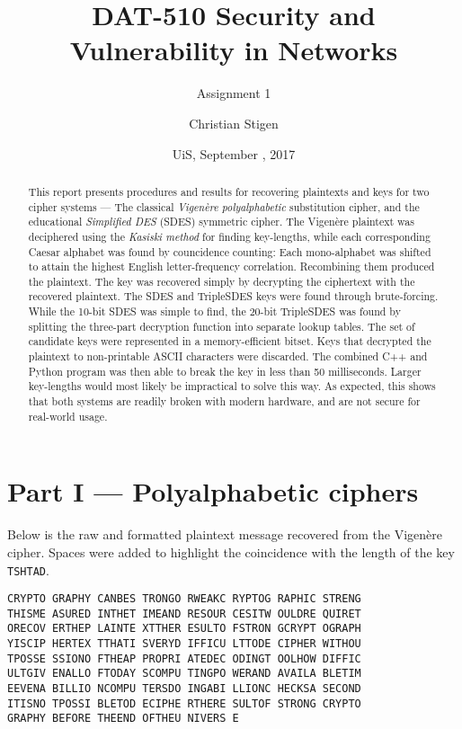 \documentclass[a4paper,english,12pt]{article}
\title{DAT-510 Security and Vulnerability in Networks}
\subtitle{Assignment 1}
\author{Christian Stigen}
\date{UiS, September \nth{18}, 2017}
\begin{document}
\maketitle


\begin{abstract}
  This report presents procedures and results for recovering plaintexts and keys
  for two cipher systems --- The classical \textit{Vigenère polyalphabetic}
  substitution cipher, and the educational \textit{Simplified DES} (SDES) symmetric cipher.
%
  The Vigenère plaintext was deciphered using the \textit{Kasiski method} for
  finding key-lengths, while each corresponding Caesar alphabet was found by
  councidence counting: Each mono-alphabet was shifted to attain the highest
  English letter-frequency correlation. Recombining them produced the
  plaintext. The key was recovered simply by decrypting the ciphertext with the
  recovered plaintext.
%
  The SDES and TripleSDES keys were found through brute-forcing. While the
  10-bit SDES was simple to find, the 20-bit TripleSDES was found by splitting
  the three-part decryption function into separate lookup tables. The set of
  candidate keys were represented in a memory-efficient bitset. Keys that
  decrypted the plaintext to non-printable ASCII characters were discarded.
  The combined C++ and Python program was then able to break the key in less
  than 50 milliseconds.  Larger key-lengths would most likely be impractical to
  solve this way.
%
  As expected, this shows that both systems are readily broken with modern
  hardware, and are not secure for real-world usage.
\end{abstract}

\section{Part I --- Polyalphabetic ciphers}

Below is the raw and formatted plaintext message recovered from the Vigenère
cipher\cite{wiki:vigenere, wiki:polyalphabetic}. Spaces were added to highlight
the coincidence with the length of the key \texttt{TSHTAD}.

\begin{verbatim}
CRYPTO GRAPHY CANBES TRONGO RWEAKC RYPTOG RAPHIC STRENG
THISME ASURED INTHET IMEAND RESOUR CESITW OULDRE QUIRET
ORECOV ERTHEP LAINTE XTTHER ESULTO FSTRON GCRYPT OGRAPH
YISCIP HERTEX TTHATI SVERYD IFFICU LTTODE CIPHER WITHOU
TPOSSE SSIONO FTHEAP PROPRI ATEDEC ODINGT OOLHOW DIFFIC
ULTGIV ENALLO FTODAY SCOMPU TINGPO WERAND AVAILA BLETIM
EEVENA BILLIO NCOMPU TERSDO INGABI LLIONC HECKSA SECOND
ITISNO TPOSSI BLETOD ECIPHE RTHERE SULTOF STRONG CRYPTO
GRAPHY BEFORE THEEND OFTHEU NIVERS E
\end{verbatim}
\end{document}
